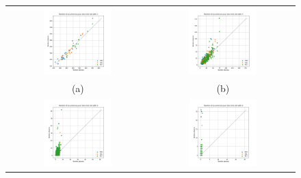 \documentclass[a4paper,12pt]{article}
\begin{document}
\begin{figure}
\centering
\begin{tabular}{@{} c @{} c @{}}
\includegraphics[width=0.5\textwidth]{Figures/graphe_occurrences_Markov_2.png} & \includegraphics[width=0.5\textwidth]{Figures/graphe_occurrences_Markov_4.png} \tabularnewline
(a) & (b) \tabularnewline
\includegraphics[width=0.5\textwidth]{Figures/graphe_occurrences_Markov_6.png} & \includegraphics[width=0.5\textwidth]{Figures/graphe_occurrences_Markov_8.png} \tabularnewline

\end{tabular}
\end{figure}
\end{document}
